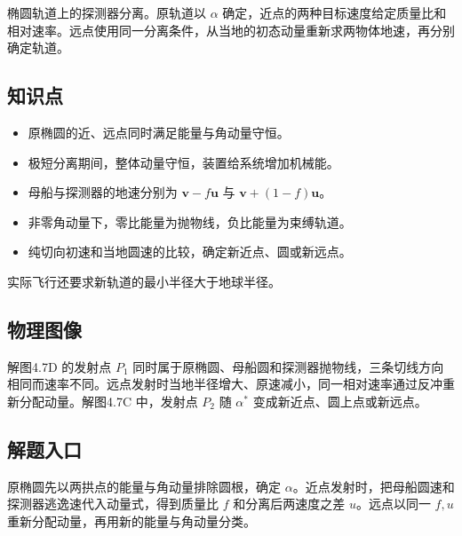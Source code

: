 \documentclass[UTF8,fontset=fandol,a4paper,11pt]{ctexart}
\newcommand{\vect}[1]{\bm{#1}}
\begin{document}
椭圆轨道上的探测器分离。原轨道以 $\alpha$ 确定，近点的两种目标速度给定质量比和相对速率。远点使用同一分离条件，从当地的初态动量重新求两物体地速，再分别确定轨道。



\subsection*{知识点}

\begin{itemize}
\item 原椭圆的近、远点同时满足能量与角动量守恒。
\item 极短分离期间，整体动量守恒，装置给系统增加机械能。
\item 母船与探测器的地速分别为 $\vect v-f\vect u$ 与 $\vect v+(1-f)\vect u$。
\item 非零角动量下，零比能量为抛物线，负比能量为束缚轨道。
\item 纯切向初速和当地圆速的比较，确定新近点、圆或新远点。
\end{itemize}
实际飞行还要求新轨道的最小半径大于地球半径。




\subsection*{物理图像}

解图4.7D 的发射点 $P_1$ 同时属于原椭圆、母船圆和探测器抛物线，三条切线方向相同而速率不同。远点发射时当地半径增大、原速减小，同一相对速率通过反冲重新分配动量。解图4.7C 中，发射点 $P_2$ 随 $\alpha^*$ 变成新近点、圆上点或新远点。



\subsection*{解题入口}

原椭圆先以两拱点的能量与角动量排除圆根，确定 $\alpha$。近点发射时，把母船圆速和探测器逃逸速代入动量式，得到质量比 $f$ 和分离后两速度之差 $u$。远点以同一 $f,u$ 重新分配动量，再用新的能量与角动量分类。


\end{document}
